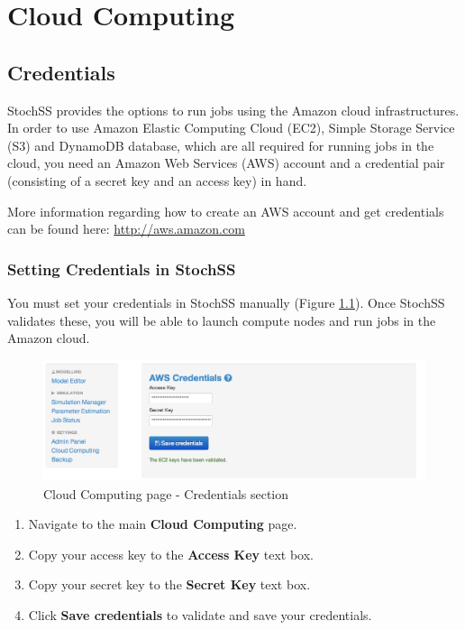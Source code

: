 \chapter{Cloud Computing}

\section{Credentials}
StochSS provides the options to run jobs using the Amazon cloud infrastructures. In order to use Amazon Elastic Computing Cloud (EC2), Simple Storage Service (S3) and DynamoDB database, which are all required for running jobs in the cloud, you need an Amazon Web Services (AWS) account and a credential pair (consisting of a secret key and an access key) in hand. 

More information regarding how to create an AWS account and get credentials can be found here: \url{http://aws.amazon.com}

\subsection{Setting Credentials in StochSS}
You must set your credentials in StochSS manually (Figure \ref{fig:1}). Once StochSS validates these, you will be able to launch compute nodes and run jobs in the Amazon cloud.

\begin{figure}[!ht]
\centering
\includegraphics[scale=0.45]{T6/T6_fig_credentials.png}
\caption{Cloud Computing page - Credentials section}
\label{fig:1}
\end{figure}

\begin{enumerate}
\item Navigate to the main \textbf{Cloud Computing} page.
\item Copy your access key to the \textbf{Access Key} text box.
\item Copy your secret key to the \textbf{Secret Key} text box. 
\item Click \textbf{Save credentials} to validate and save your credentials.
\end{enumerate}

